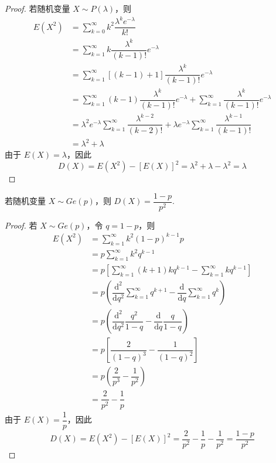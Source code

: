 \begin{proof}
    若随机变量 $X \sim P(\lambda)$，则
    $$
    \begin{aligned}
        E(X^2) &= \sum_{k=0}^{\infty} k^2 \dfrac{\lambda^k e^{-\lambda}}{k!} \\
        &= \sum_{k=1}^{\infty} k \dfrac{\lambda^{k}}{(k-1)!} e^{-\lambda} \\
        &= \sum_{k=1}^{\infty} [(k-1)+1] \dfrac{\lambda^{k}}{(k-1)!} e^{-\lambda} \\
        &= \sum_{k=1}^{\infty} (k-1) \dfrac{\lambda^{k}}{(k-1)!} e^{-\lambda} + \sum_{k=1}^{\infty} \dfrac{\lambda^{k}}{(k-1)!} e^{-\lambda} \\
        &= \lambda^2 e^{-\lambda} \sum_{k=1}^{\infty} \dfrac{\lambda^{k-2}}{(k-2)!} + \lambda e^{-\lambda} \sum_{k=1}^{\infty} \dfrac{\lambda^{k-1}}{(k-1)!} \\
        &= \lambda^2 + \lambda
    \end{aligned}
    $$
    由于 $E(X) = \lambda$，因此
    $$
    D(X) = E(X^2) - [E(X)]^2 = \lambda^2 + \lambda - \lambda^2 = \lambda
    $$
\end{proof}

\begin{conclusion}
    \indent 若随机变量 $X \sim Ge(p)$，则 $D(X) = \dfrac{1-p}{p^2}$.
\end{conclusion}

\begin{proof}
    若 $X \sim Ge(p)$，令 $q=1-p$，则
    $$
    \begin{aligned}
        E(X^2) &= \sum_{k=1}^{\infty} k^2 (1-p)^{k-1} p \\
        &= p \sum_{k=1}^{\infty} k^2 q^{k-1} \\
        &= p \left[ \sum_{k=1}^{\infty} (k+1)k q^{k-1} - \sum_{k=1}^{\infty} k q^{k-1} \right] \\
        &= p \left( \dfrac{\text{d}^2}{\text{d}q^2} \sum_{k=1}^{\infty} q^{k+1} - \dfrac{\text{d}}{\text{d}q} \sum_{k=1}^{\infty} q^k \right) \\
        &= p \left( \dfrac{\text{d}^2}{\text{d}q^2} \dfrac{q^2}{1-q} - \dfrac{\text{d}}{\text{d}q} \dfrac{q}{1-q} \right) \\
        &= p \left[ \dfrac{2}{(1-q)^3} - \dfrac{1}{(1-q)^2} \right] \\
        &= p \left( \dfrac{2}{p^3} - \dfrac{1}{p^2} \right) \\
        &= \dfrac{2}{p^2} - \dfrac{1}{p}
    \end{aligned}
    $$
    由于 $E(X) = \dfrac{1}{p}$，因此
    $$
    D(X) = E(X^2) - [E(X)]^2 = \dfrac{2}{p^2} - \dfrac{1}{p} - \dfrac{1}{p^2} = \dfrac{1-p}{p^2}
    $$
\end{proof}

